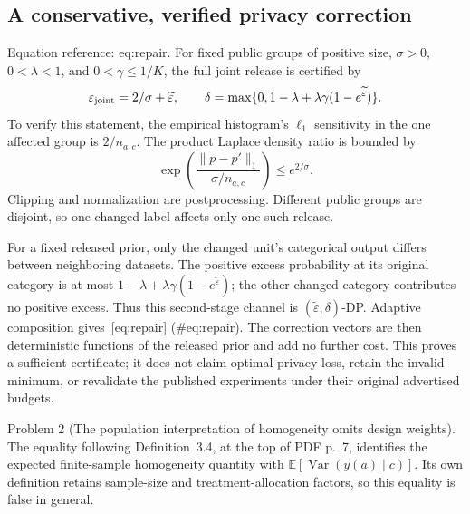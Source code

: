 \documentclass[10pt]{article}
\begin{document}
\subsection*{A conservative, verified privacy correction}
Equation reference: eq:repair. For fixed public groups of positive size, \(\sigma>0\), \(0<\lambda<1\), and \(0<\gamma\le1/K\), the full joint release is certified by \[
 \varepsilon_{\rm joint}=2/\sigma+\widetilde\varepsilon,
 \qquad
 \delta=\max\{0,1-\lambda+\lambda\gamma(1-e^{\widetilde\varepsilon})\}.\] To verify this statement, the empirical histogram’s \(\ell_1\) sensitivity in the one affected group is \(2/n_{a,c}\). The product Laplace density ratio is bounded by \[\exp\!\left(\frac{\|p-p'\|_1}{\sigma/n_{a,c}}\right)
 \le e^{2/\sigma}.\] Clipping and normalization are postprocessing. Different public groups are disjoint, so one changed label affects only one such release.\par
For a fixed released prior, only the changed unit’s categorical output differs between neighboring datasets. The positive excess probability at its original category is at most \(1-\lambda+\lambda\gamma(1-e^{\widetilde\varepsilon})\); the other changed category contributes no positive excess. Thus this second-stage channel is \((\widetilde\varepsilon,\delta)\)-DP. Adaptive composition gives [eq:repair] (\#eq:repair). The correction vectors are then deterministic functions of the released prior and add no further cost. This proves a sufficient certificate; it does not claim optimal privacy loss, retain the invalid minimum, or revalidate the published experiments under their original advertised budgets.\par
Problem 2 (The population interpretation of homogeneity omits design weights).  The equality following Definition 3.4, at the top of PDF p. 7, identifies the expected finite-sample homogeneity quantity with \(\mathbb E[\operatorname{Var}(y(a)\mid c)]\). Its own definition retains sample-size and treatment-allocation factors, so this equality is false in general.\par
\end{document}

